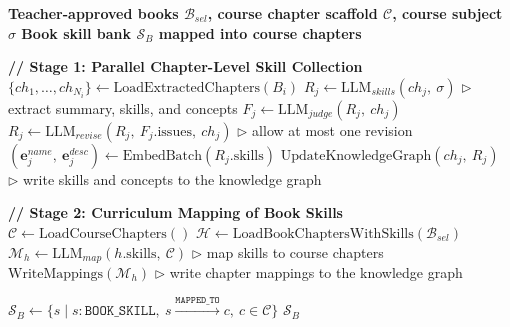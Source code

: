 \documentclass[varwidth=8.25in,border=8pt]{standalone}
\begin{document}
\setcounter{algorithm}{0}
\small
{}

\begin{algorithmic}[1]
\bfseries
\Require Teacher-approved books $\mathcal{B}_{sel}$, course chapter scaffold $\mathcal{C}$, course subject $\sigma$
\Ensure Book skill bank $\mathcal{S}_{B}$ mapped into course chapters

\State \textbf{// Stage 1: Parallel Chapter-Level Skill Collection}
    \State $\{ch_1, \dots, ch_{N_i}\} \leftarrow \text{LoadExtractedChapters}(B_i)$
        \State $R_j \leftarrow \text{LLM}_{skills}(ch_j,\ \sigma)$
        \Statex \hspace{\algorithmicindent} $\triangleright$ extract summary, skills, and concepts
        \State $F_j \leftarrow \text{LLM}_{judge}(R_j,\ ch_j)$
            \State $R_j \leftarrow \text{LLM}_{revise}(R_j,\ F_j.\text{issues},\ ch_j)$
            \Statex \hspace{\algorithmicindent} $\triangleright$ allow at most one revision
        \EndIf
        \State $(\mathbf{e}^{name}_j,\ \mathbf{e}^{desc}_j) \leftarrow \text{EmbedBatch}(R_j.\text{skills})$
        \State $\text{UpdateKnowledgeGraph}(ch_j,\ R_j)$
        \Statex \hspace{\algorithmicindent} $\triangleright$ write skills and concepts to the knowledge graph
    \EndFor
\EndFor

\State
\State \textbf{// Stage 2: Curriculum Mapping of Book Skills}
\State $\mathcal{C} \leftarrow \text{LoadCourseChapters}()$
\State $\mathcal{H} \leftarrow \text{LoadBookChaptersWithSkills}(\mathcal{B}_{sel})$
    \State $\mathcal{M}_h \leftarrow \text{LLM}_{map}(h.\text{skills},\ \mathcal{C})$
    \Statex \hspace{\algorithmicindent} $\triangleright$ map skills to course chapters
    \State $\text{WriteMappings}(\mathcal{M}_h)$
    \Statex \hspace{\algorithmicindent} $\triangleright$ write chapter mappings to the knowledge graph
\EndFor

\State
\State $\mathcal{S}_{B} \leftarrow \{s \mid s:\texttt{BOOK\_SKILL},\ s \xrightarrow{\texttt{MAPPED\_TO}} c,\ c \in \mathcal{C}\}$
\State \Return $\mathcal{S}_{B}$
\end{algorithmic}
\end{document}
